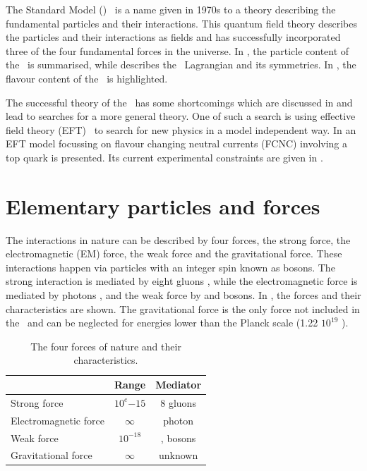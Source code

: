 The Standard Model (\SM)~\cite{Peskin:257493} 
is a name given in 1970s to a theory describing the fundamental particles and their interactions. This quantum field theory describes the particles and their interactions as fields and has successfully incorporated three of the four fundamental forces in the universe. In , the particle content of the \SM\ is summarised, while  describes  the \SM\ Lagrangian and its symmetries. In , the flavour content of the \SM\ is highlighted. 

The successful theory of the \SM\ has some shortcomings which are discussed in  and lead to searches for a more general theory. One of such a search is using effective field theory (EFT)~\cite{Burgess:2007pt} to search for new physics in a model independent way. In  an EFT model focussing on flavour changing neutral currents (FCNC) involving a top quark is presented. Its current experimental constraints are given in .



\section{Elementary particles and forces}
\label{sec:SMcontent}
The interactions in nature can be described by four forces, the strong force, the electromagnetic (EM) force, the weak force and the gravitational force. These interactions happen via particles with an integer spin known as bosons. The strong interaction is mediated by eight gluons \Pgluon, while the electromagnetic force is mediated by photons \Pphoton, and the weak force by \PZ and \PWpm bosons. In , the forces and their characteristics are shown. The gravitational force is the only force not included in the \SM\ and can be neglected for energies lower than the Planck scale (1.22 $10^{19}$ \GeV).
\begin{table}[htbp]
	\centering
	\caption{The four forces of nature and their characteristics.}
	\begin{tabular}{lcc}
		\toprule
		& Range & Mediator \\ 
		\midrule
		Strong force & $10^e{-15}$ \m & 8 gluons  \\ 
	
		Electromagnetic force & $\infty$ & photon  \\ 
		 
		Weak force & $10^{-18}$ \m & \PWpm, \PZ bosons \\ 
		
		Gravitational force & $\infty$ & unknown \\ 
		\bottomrule
	\end{tabular} 
	\label{tab:forces}
\end{table}


